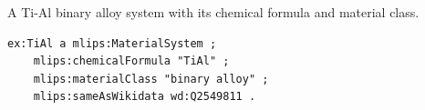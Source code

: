 A Ti-Al binary alloy system with its chemical formula and material class.
\begin{lstlisting}[language=turtle]
ex:TiAl a mlips:MaterialSystem ;
    mlips:chemicalFormula "TiAl" ;
    mlips:materialClass "binary alloy" ;
    mlips:sameAsWikidata wd:Q2549811 .
\end{lstlisting}

